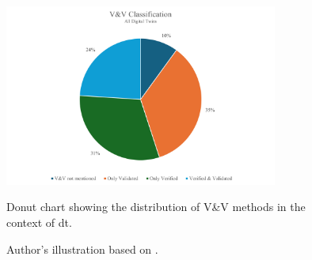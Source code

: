 \begin{figure}[htbp]
    \centering
    \includegraphics[width=0.8\textwidth]{figures/vvbitencourt.png}
    \caption[Donut Chart V\&V]{Donut chart showing the distribution of V\&V methods in the context of \gls{dt}.}
    \label{fig:vvbitencourt}
    \caption*{Author's illustration based on \textcite{Bitencourt2023}.}
\end{figure}

